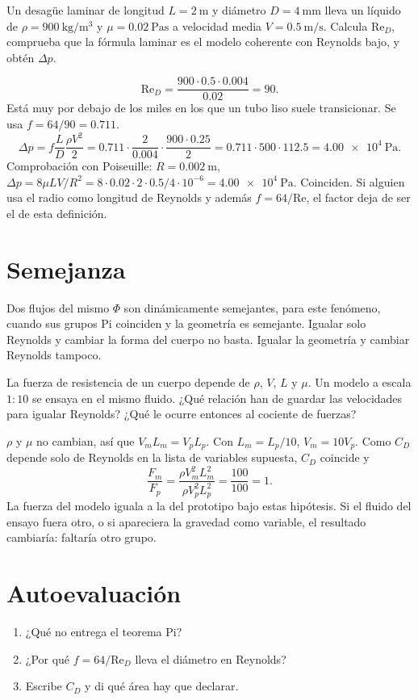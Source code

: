\begin{problembox}
Un desagüe laminar de longitud \(L=\qty{2}{\metre}\) y diámetro \(D=\qty{4}{\milli\metre}\) lleva un líquido de \(\rho=\qty{900}{\kilogram\per\cubic\metre}\) y \(\mu=\qty{0.02}{\pascal\second}\) a velocidad media \(V=\qty{0.5}{\metre\per\second}\). Calcula \(\mathrm{Re}_D\), comprueba que la fórmula laminar es el modelo coherente con Reynolds bajo, y obtén \(\Delta p\).
\end{problembox}
\begin{solutionbox}
\[
\mathrm{Re}_D=\frac{900\cdot 0.5\cdot 0.004}{0.02}=90.
\]
Está muy por debajo de los miles en los que un tubo liso suele transicionar. Se usa \(f=64/90=0.711\).
\[
\Delta p=f\frac{L}{D}\frac{\rho V^2}{2}
=0.711\cdot\frac{2}{0.004}\cdot\frac{900\cdot 0.25}{2}
=0.711\cdot 500\cdot 112.5
=\qty{4.00e4}{\pascal}.
\]
Comprobación con Poiseuille: \(R=\qty{0.002}{\metre}\), \(\Delta p=8\mu L V/R^2=8\cdot 0.02\cdot 2\cdot 0.5 / 4\cdot 10^{-6}=\qty{4.00e4}{\pascal}\). Coinciden. Si alguien usa el radio como longitud de Reynolds y además \(f=64/\mathrm{Re}\), el factor deja de ser el de esta definición.
\end{solutionbox}

\section{Semejanza}

Dos flujos del mismo \(\Phi\) son dinámicamente semejantes, para este fenómeno, cuando sus grupos Pi coinciden y la geometría es semejante. Igualar solo Reynolds y cambiar la forma del cuerpo no basta. Igualar la geometría y cambiar Reynolds tampoco.

\begin{problembox}[Aplicación]
La fuerza de resistencia de un cuerpo depende de \(\rho\), \(V\), \(L\) y \(\mu\). Un modelo a escala \(1:10\) se ensaya en el mismo fluido. ¿Qué relación han de guardar las velocidades para igualar Reynolds? ¿Qué le ocurre entonces al cociente de fuerzas?
\end{problembox}
\begin{solutionbox}
\(\rho\) y \(\mu\) no cambian, así que \(V_m L_m=V_p L_p\). Con \(L_m=L_p/10\), \(V_m=10 V_p\). Como \(C_D\) depende solo de Reynolds en la lista de variables supuesta, \(C_D\) coincide y
\[
\frac{F_m}{F_p}=\frac{\rho V_m^2 L_m^2}{\rho V_p^2 L_p^2}=\frac{100}{100}=1.
\]
La fuerza del modelo iguala a la del prototipo bajo estas hipótesis. Si el fluido del ensayo fuera otro, o si apareciera la gravedad como variable, el resultado cambiaría: faltaría otro grupo.
\end{solutionbox}

\section{Autoevaluación}
\begin{enumerate}[leftmargin=1.4em]
\item ¿Qué no entrega el teorema Pi?
\item ¿Por qué \(f=64/\mathrm{Re}_D\) lleva el diámetro en Reynolds?
\item Escribe \(C_D\) y di qué área hay que declarar.
\end{enumerate}
